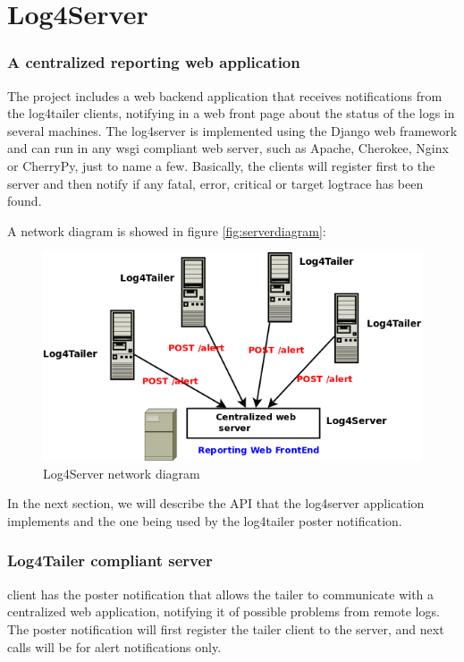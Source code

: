 \part{Log4Server}

\section{A centralized reporting web application}
\label{sec:log4server}
The \logftailer{} project includes a web backend application that receives notifications 
from the log4tailer clients, notifying in a web front page about the status of the logs 
in several machines. The log4server is implemented using the Django web framework and can run 
in any wsgi compliant web server, such as Apache, Cherokee, Nginx or CherryPy, just to name 
a few. Basically, the clients will register first to the server and then notify if any fatal, 
error, critical or target logtrace has been found. 

A network diagram is showed in figure \autoref{fig:serverdiagram}:

\begin{figure}[hb]
\centering
\includegraphics[scale=0.50]{serverdiagram.png}
\caption{Log4Server network diagram}\label{fig:serverdiagram}
\end{figure}


In the next section, we will describe the API that the log4server application implements and the 
one being used by the log4tailer poster notification.

\section{Log4Tailer compliant server}
\logftailer{} client has the poster notification that allows the tailer to communicate 
with a centralized web application, notifying it of possible problems from remote logs. 
The poster notification will first register the tailer client to the server, and next 
calls will be for alert notifications only.

